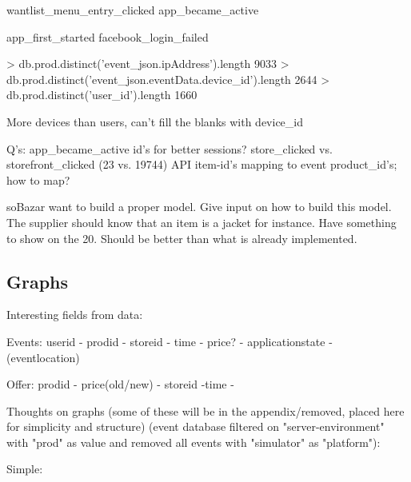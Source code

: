 wantlist\_menu\_entry\_clicked
app\_became\_active

app\_first\_started
facebook\_login\_failed

> db.prod.distinct('event\_json.ipAddress').length
9033
> db.prod.distinct('event\_json.eventData.device\_id').length
2644
> db.prod.distinct('user\_id').length
1660

More devices than users, can't fill the blanks with device\_id

Q's:
    app\_became\_active id's for better sessions?
    store\_clicked vs. storefront\_clicked (23 vs. 19744)
    API item-id's mapping to event product\_id's; how to map?



soBazar want to build a proper model.  Give input on how to build this model.
The supplier should know that an item is a jacket for instance.  Have something
to show on the 20. Should be better than what is already implemented.

\subsection{Graphs}

Interesting fields from data:

    Events: userid - prodid - storeid - time - price? - applicationstate - (eventlocation)

    Offer: prodid - price(old/new) - storeid -time -

Thoughts on graphs (some of these will be in the appendix/removed, placed here
for simplicity and structure) (event database filtered on "server-environment"
with "prod" as value and removed all events with "simulator" as "platform"):



    Simple:

